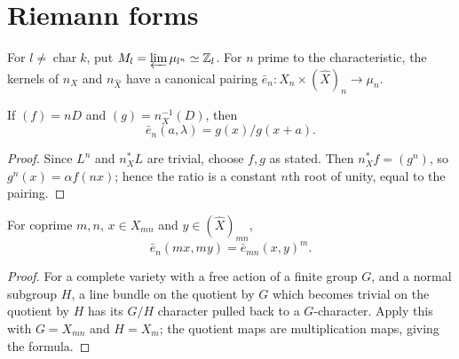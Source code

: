 \section{Riemann forms}
\label{mumford-IV20-opening-source}

\begin{definition}
\label{mumford-def-weil-pairing-ladic}
For $l\ne\operatorname{char}k$, put
$M_l=\varprojlim\mu_{l^n}\simeq\mathbb Z_l$. For $n$ prime to the
characteristic, the kernels of $n_X$ and $n_{\widehat X}$ have a canonical
pairing $\bar e_n:X_n\times(\widehat X)_n\to\mu_n$.
\end{definition}

\begin{lemma}
\label{mumford-lem-riemann-pairing-divisor}
If $(f)=nD$ and $(g)=n_X^{-1}(D)$, then
\[
\bar e_n(a,\lambda)=g(x)/g(x+a).
\]
\end{lemma}
\begin{proof}
Since $L^n$ and $n_X^*L$ are trivial, choose $f,g$ as stated. Then
$n_X^*f=(g^n)$, so $g^n(x)=\alpha f(nx)$; hence the ratio is a constant
$n$th root of unity, equal to the pairing.
\end{proof}

\begin{proposition}
\label{mumford-prop-riemann-pairing-compatibility}
For coprime $m,n$, $x\in X_{mn}$ and $y\in(\widehat X)_{mn}$,
\[
\bar e_n(mx,my)=\bar e_{mn}(x,y)^m.
\]
\end{proposition}
\begin{proof}
For a complete variety with a free action of a finite group $G$, and a
normal subgroup $H$, a line bundle on the quotient by $G$ which becomes
trivial on the quotient by $H$ has its $G/H$ character pulled back to a
$G$-character. Apply this with $G=X_{mn}$ and $H=X_m$; the quotient maps
are multiplication maps, giving the formula.
\end{proof}
